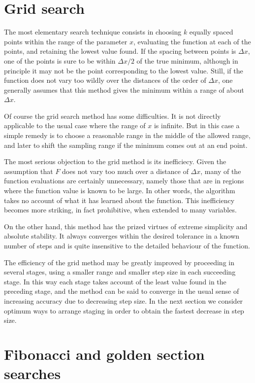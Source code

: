  
\section{Grid search}
 
     The most elementary search technique consists in choosing $k$ equally
spaced points within the range of the parameter $x$, evaluating the
function at each of the points, and retaining the lowest value found. If
the spacing between points is $\Delta x$, one of the points is sure to be
within
$\Delta x/2$ of the true minimum, although in principle it may not be the point
corresponding to the lowest value.  Still, if the function does not vary
too wildly over the distances of the order of $\Delta x$, one generally assumes
that this method gives the minimum within a range of about $\Delta x$.
 
     Of course the grid search method has some difficulties. It is not
directly applicable to the usual case where the range of $x$ is infinite. But 
in this case a simple remedy is to choose a reasonable range in the
middle of the allowed range, and later to shift the sampling range if the
minimum comes out at an end point.
 
     The most serious objection to the grid method is its inefficiecy. Given 
the assumption that $F$ does not vary too much over a distance
of $\Delta x$,
many of the function evaluations are certainly unnecessary, namely those
that are in regions where the function value is known to be large. In
other words, the algorithm takes no account of what it has learned 
about the function.  
  This inefficiency becomes more striking, in fact
prohibitive, when extended to many variables.
 
     On the other hand, this method has the prized virtues of extreme
simplicity and absolute stability.  It always converges within the
desired tolerance in a known number of steps and is quite insensitive
to the detailed behaviour of the function.
 
     The efficiency of the grid method may be greatly improved by
proceeding in several stages, using a smaller range and smaller step
size in each succeeding stage.  In this way each stage takes account of
the least value found in the preceding stage, and the method can be said
to converge in the usual sense of increasing accuracy due to decreasing
step size.  In the next section we consider optimum ways to arrange
staging in order to obtain the fastest decrease in step size.
 
 
\section{Fibonacci and golden section searches}
 
